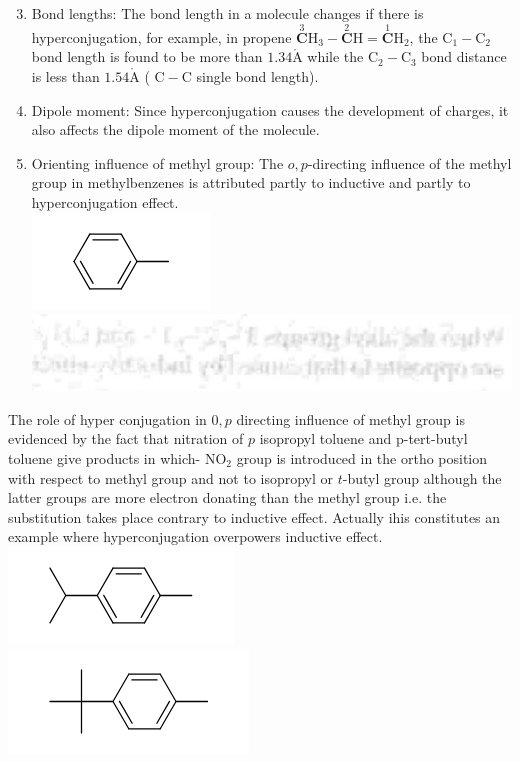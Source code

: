 \documentclass[10pt]{article}
\def\AA{\mathring{\mathrm{A}}}
\begin{document}
\begin{enumerate}
  \setcounter{enumi}{2}
  \item Bond lengths: The bond length in a molecule changes if there is hyperconjugation, for example, in propene $\stackrel{3}{\mathbf{C}} \mathrm{H}_{3}-\stackrel{2}{\mathbf{C}} \mathrm{H}=\stackrel{1}{\mathbf{C}} \mathrm{H}_{2}$, the $\mathrm{C}_{1}-\mathrm{C}_{2}$ bond length is found to be more than $1.34 \AA$ while the $\mathrm{C}_{2}-\mathrm{C}_{3}$ bond distance is less than $1.54 \AA$ ( $\mathrm{C}-\mathrm{C}$ single bond length).
  \item Dipole moment: Since hyperconjugation causes the development of charges, it also affects the dipole moment of the molecule.
  \item Orienting influence of methyl group: The $o, p$-directing influence of the methyl group in methylbenzenes is attributed partly to inductive and partly to hyperconjugation effect.\\
\includegraphics{smile-56574873ad255570d026c0052d98eb8292e9caf2}\\
\includegraphics[max width=\textwidth, center]{2025_01_28_8470952b98110cec3aabg-082}
\end{enumerate}

The role of hyper conjugation in $0, p$ directing influence of methyl group is evidenced by the fact that nitration of $p$ isopropyl toluene and p-tert-butyl toluene give products in which- $\mathrm{NO}_{2}$ group is introduced in the ortho position with respect to methyl group and not to isopropyl or $t$-butyl group although the latter groups are more electron donating than the methyl group i.e. the substitution takes place contrary to inductive effect. Actually ihis constitutes an example where hyperconjugation overpowers inductive effect.\\
\includegraphics{smile-e223f45847e5ead56dd39a29e952e88341fc2253}\\
\includegraphics{smile-a25508f21f713e965a08ddc43a94f69ba6fa6d26}
\end{document}
